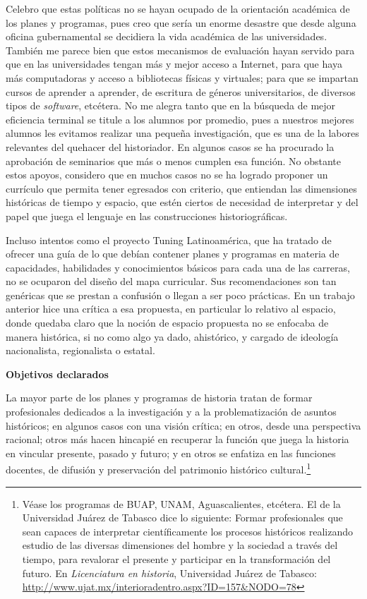 Celebro que estas políticas no se hayan ocupado de la orientación 
académica de los planes y programas, pues creo que sería un enorme 
desastre que desde alguna oficina gubernamental se decidiera la vida 
académica de las universidades. También me parece bien que estos 
mecanismos de evaluación hayan servido para que en las universidades 
tengan más y mejor acceso a Internet, para que haya más computadoras y 
acceso a bibliotecas físicas y virtuales; para que se impartan cursos 
de aprender a aprender, de escritura de géneros universitarios, de 
diversos tipos de \textit{software}, etcétera. No me alegra tanto que en la 
búsqueda de mejor eficiencia terminal se titule a los alumnos por 
promedio, pues a nuestros mejores alumnos les evitamos realizar una 
pequeña investigación, que es una de la labores relevantes del quehacer 
del historiador. En algunos casos se ha procurado la aprobación de 
seminarios que más o menos cumplen esa función.  No obstante estos 
apoyos, considero que en muchos casos no se ha logrado proponer un 
currículo que permita tener egresados con criterio, que entiendan las 
dimensiones históricas de tiempo y espacio, que estén ciertos de 
necesidad de interpretar y del papel que juega el lenguaje en las 
construcciones historiográficas. 

Incluso intentos como el proyecto Tuning Latinoamérica, que ha tratado 
de ofrecer una guía de lo que debían contener planes y programas en 
materia de capacidades, habilidades y conocimientos básicos para cada 
una de las carreras, no se ocuparon del diseño del mapa curricular. Sus 
recomendaciones son tan genéricas que se prestan a confusión o llegan 
a ser poco prácticas. En un trabajo anterior hice una crítica a esa 
propuesta, en particular lo relativo al espacio, donde quedaba claro 
que la noción de espacio propuesta no se enfocaba de manera histórica, 
si no como algo ya dado, ahistórico, y cargado de ideología 
nacionalista, regionalista o estatal.

\medskip
\textbf{Objetivos declarados}
\enlargethispage{1\baselineskip}

La mayor parte de los planes y programas de historia tratan de formar
profesionales dedicados a la investigación y a la problematización de asuntos
históricos; en algunos casos con una visión crítica; en otros, desde una
perspectiva racional; otros más hacen hincapié en recuperar la función que
juega la historia en vincular presente, pasado y futuro; y en otros se
enfatiza en las funciones docentes, de difusión y preservación del
patrimonio histórico cultural.\footnote{Véase los programas de BUAP, UNAM,
Aguascalientes, etcétera. El de la Universidad Juárez de Tabasco dice lo
siguiente: Formar profesionales que sean capaces de interpretar
científicamente los procesos históricos realizando estudio de las diversas
dimensiones del hombre y la sociedad a través del tiempo, para revalorar el
presente y participar en la transformación del futuro. En \textit{Licenciatura en
historia}, Universidad Juárez de Tabasco: 
\url{http://www.ujat.mx/interioradentro.aspx?ID=157&NODO=78}} 

